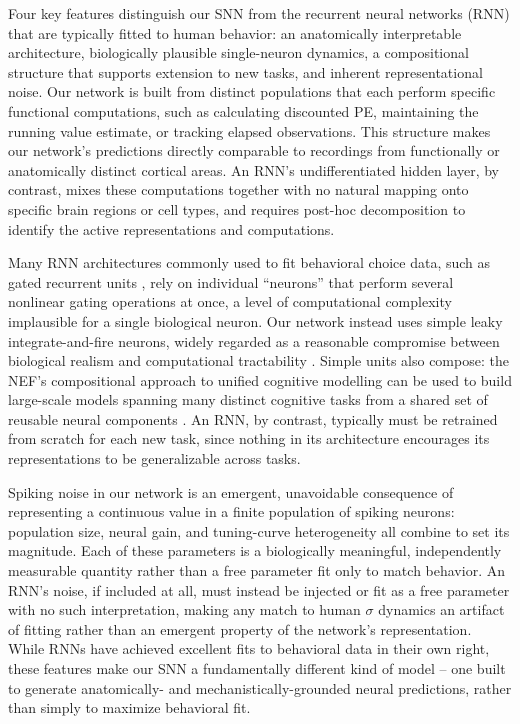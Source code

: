 \documentclass[12pt]{article}
\begin{document}
Four key features distinguish our SNN from the recurrent neural networks (RNN) that are typically fitted to human behavior: an anatomically interpretable architecture, biologically plausible single-neuron dynamics, a compositional structure that supports extension to new tasks, and inherent representational noise. Our network is built from distinct populations that each perform specific functional computations, such as calculating discounted PE, maintaining the running value estimate, or tracking elapsed observations. This structure makes our network's predictions directly comparable to recordings from functionally or anatomically distinct cortical areas. An RNN's undifferentiated hidden layer, by contrast, mixes these computations together with no natural mapping onto specific brain regions or cell types, and requires post-hoc decomposition to identify the active representations and computations.

Many RNN architectures commonly used to fit behavioral choice data, such as gated recurrent units \cite{jian2025discovering}, rely on individual ``neurons'' that perform several nonlinear gating operations at once, a level of computational complexity implausible for a single biological neuron. Our network instead uses simple leaky integrate-and-fire neurons, widely regarded as a reasonable compromise between biological realism and computational tractability \cite{eliasmith2013build, gerstner2014neuronal, dayan2005theoretical}. Simple units also compose: the NEF's compositional approach to unified cognitive modelling can be used to build large-scale models spanning many distinct cognitive tasks from a shared set of reusable neural components \cite{choo2018spaun}. An RNN, by contrast, typically must be retrained from scratch for each new task, since nothing in its architecture encourages its representations to be generalizable across tasks.

Spiking noise in our network is an emergent, unavoidable consequence of representing a continuous value in a finite population of spiking neurons: population size, neural gain, and tuning-curve heterogeneity all combine to set its magnitude. Each of these parameters is a biologically meaningful, independently measurable quantity rather than a free parameter fit only to match behavior. An RNN's noise, if included at all, must instead be injected or fit as a free parameter with no such interpretation, making any match to human $\sigma$ dynamics an artifact of fitting rather than an emergent property of the network's representation. While RNNs have achieved excellent fits to behavioral data in their own right, these features make our SNN a fundamentally different kind of model -- one built to generate anatomically- and mechanistically-grounded neural predictions, rather than simply to maximize behavioral fit.
\end{document}
